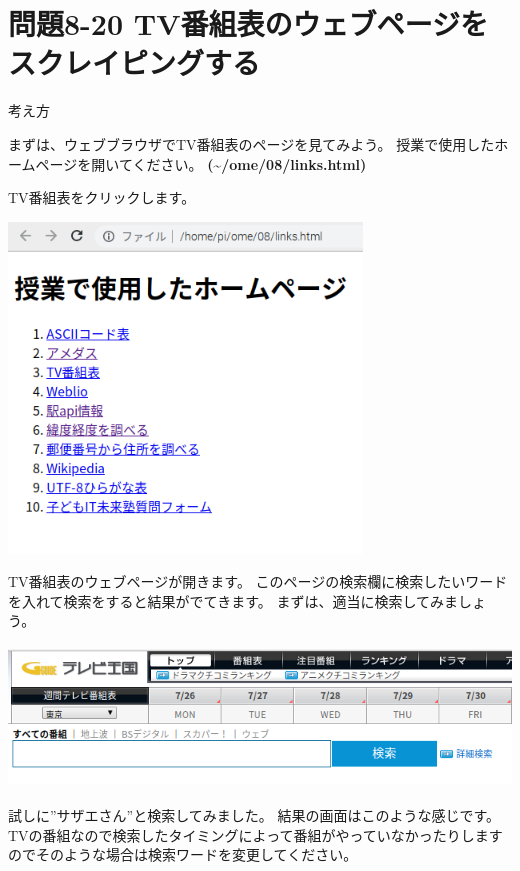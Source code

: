 \documentclass[a4paper,12pt,dvipdfmx]{jarticle}
\begin{document}
\bigskip


\bigskip

\clearpage\section*{問題8-20
TV番組表のウェブページをスクレイピングする}
考え方

まずは、ウェブブラウザでTV番組表のページを見てみよう。
授業で使用したホームページを開いてください。
\textbf{(\~{}/ome/08/links.html)}

TV番組表をクリックします。 



\begin{center}
\includegraphics[width=9.398cm,height=8.784cm]{textbook-img017.png}

\end{center}


\bigskip


\bigskip

TV番組表のウェブページが開きます。
このページの検索欄に検索したいワードを入れて検索をすると結果がでてきます。
まずは、適当に検索してみましょう。



\begin{center}
\includegraphics[width=14.099cm,height=3.768cm]{textbook-img041.png}

\end{center}
\clearpage
試しに”サザエさん”と検索してみました。
結果の画面はこのような感じです。
TVの番組なので検索したタイミングによって番組がやっていなかったりしますのでそのような場合は検索ワードを変更してください。
\end{document}

